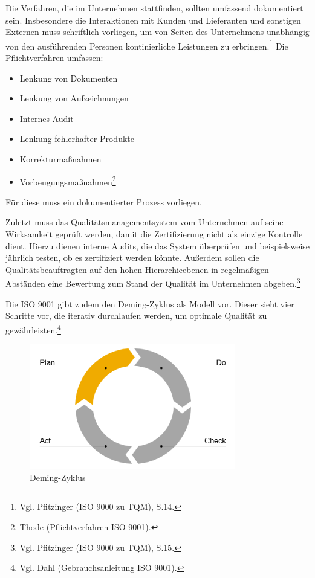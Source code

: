             Die Verfahren, die im Unternehmen stattfinden, sollten umfassend dokumentiert sein. Insbesondere die Interaktionen mit Kunden und Lieferanten und sonstigen Externen muss schriftlich vorliegen, um von Seiten des Unternehmens unabhängig von den ausführenden Personen kontinierliche Leistungen zu erbringen.\footnote{Vgl. Pfitzinger (ISO 9000 zu TQM), S.14.} Die Pflichtverfahren umfassen:
            \begin{itemize}
              \item Lenkung von Dokumenten
              \item Lenkung von Aufzeichnungen
              \item Internes Audit
              \item Lenkung fehlerhafter Produkte
              \item Korrekturmaßnahmen
              \item Vorbeugungsmaßnahmen\footnote{Thode (Pflichtverfahren ISO 9001).}
            \end{itemize}
            Für diese muss ein dokumentierter Prozess vorliegen.

            Zuletzt muss das Qualitätsmanagementsystem vom Unternehmen auf seine Wirksamkeit geprüft werden, damit die Zertifizierung nicht als einzige Kontrolle dient. Hierzu dienen interne Audits, die das System überprüfen und beispielsweise jährlich testen, ob es zertifiziert werden könnte. Außerdem sollen die Qualitätsbeauftragten auf den hohen Hierarchieebenen in regelmäßigen Abständen eine Bewertung zum Stand der Qualität im Unternehmen abgeben.\footnote{Vgl. Pfitzinger (ISO 9000 zu TQM), S.15.}

            Die ISO 9001 gibt zudem den Deming-Zyklus als Modell vor. Dieser sieht vier Schritte vor, die iterativ durchlaufen werden, um optimale Qualität zu gewährleisten.\footnote{Vgl. Dahl (Gebrauchsanleitung ISO 9001).}
            \begin{figure}[H]
                \begin{center}
                    \includegraphics[width=9cm]{Abbildungen/pdca}
                    \caption{Deming-Zyklus}
                    \label{abb:pdca}
                \end{center}
            \end{figure}

